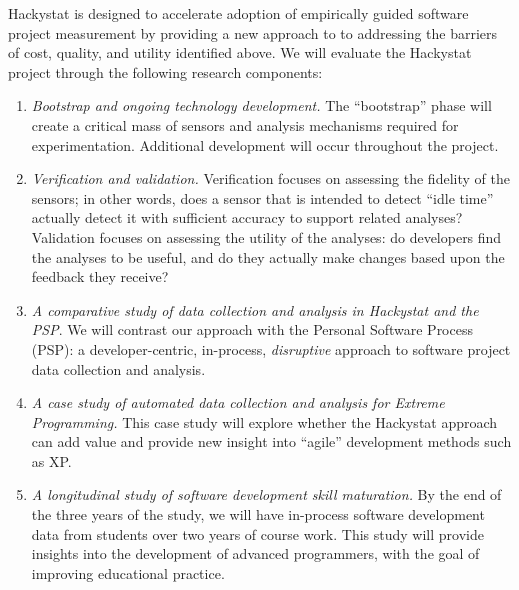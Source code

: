 Hackystat is designed to accelerate adoption of empirically guided software 
project measurement by providing a new approach to to addressing the
barriers of cost, quality, and utility identified above.  We will evaluate
the Hackystat project through the following
research components:

\begin{enumerate}
  
\item {\em Bootstrap and ongoing technology development.}  The
  ``bootstrap'' phase will create a critical mass of sensors
  and analysis mechanisms required for experimentation.
 Additional development will occur throughout the project.
  
\item 
{\em Verification and validation.}  Verification focuses on assessing
the fidelity of the sensors; in other words, does a sensor that is intended 
to detect ``idle time'' actually detect it with sufficient accuracy to
support related analyses? Validation focuses on assessing the utility of
the analyses: do developers find the analyses to be useful, and do they
actually make changes based upon the feedback they receive?
  
\item {\em A comparative study of data collection and analysis in Hackystat
    and the PSP}.  We will contrast our approach with the Personal Software
  Process (PSP):  a developer-centric, in-process, {\em disruptive}
  approach to software project data collection and analysis.

\item {\em A case study of automated data collection and analysis for
Extreme Programming.} This case study will explore whether the Hackystat
approach can add value and provide new insight into ``agile''
development methods such as XP.

\item {\em A longitudinal study of software development skill maturation.}
  By the end of the three years of the study, we will have in-process
  software development data from students over two years of course work.
  This study will provide insights into the development of advanced
  programmers, with the goal of improving educational practice.

\end{enumerate}  
 






